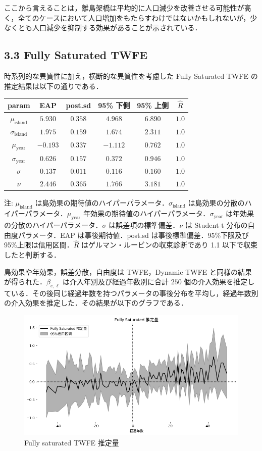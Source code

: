 ここから言えることは，離島架橋は平均的に人口減少を改善させる可能性が高く，全てのケースにおいて人口増加をもたらすわけではないかもしれないが，少なくとも人口減少を抑制する効果があることが示されている．

\hypertarget{fully-saturated-twfe-1}{%
\subsection{3.3 Fully Saturated TWFE}\label{fully-saturated-twfe-1}}

時系列的な異質性に加え，横断的な異質性を考慮した Fully Saturated TWFE
の推定結果は以下の通りである．

\begin{longtable}[]{@{}cccccc@{}}
\toprule
param & EAP & post.sd & 95\% 下側 & 95\% 上側 &
\(\hat{R}\)\tabularnewline
\midrule
\endhead
\(\mu_{\text{island}}\) & \(5.930\) & \(0.358\) & \(4.968\) & \(6.890\)
& \(1.0\)\tabularnewline
\(\sigma_{\text{island}}\) & \(1.975\) & \(0.159\) & \(1.674\) &
\(2.311\) & \(1.0\)\tabularnewline
\(\mu_{\text{year}}\) & \(-0.193\) & \(0.337\) & \(-1.112\) & \(0.762\)
& \(1.0\)\tabularnewline
\(\sigma_{\text{year}}\) & \(0.626\) & \(0.157\) & \(0.372\) & \(0.946\)
& \(1.0\)\tabularnewline
\(\sigma\) & \(0.137\) & \(0.011\) & \(0.116\) & \(0.160\) &
\(1.0\)\tabularnewline
\(\nu\) & \(2.446\) & \(0.365\) & \(1.766\) & \(3.181\) &
\(1.0\)\tabularnewline
\bottomrule
\end{longtable}

注: \(\mu_{\text{island}}\)
は島効果の期待値のハイパーパラメータ．\(\sigma_{\text{island}}\)
は島効果の分散のハイパーパラメータ．\(\mu_{\text{year}}\)
年効果の期待値のハイパーパラメータ．\(\sigma_{\text{year}}\)
は年効果の分散のハイパーパラメータ．\(\sigma\)
は誤差項の標準偏差．\(\nu\) は \(\text{Student-t}\)
分布の自由度パラメータ．EAP は事後期待値．post.sd
は事後標準偏差．95\%下限及び 95\%上限は信用区間．\(\hat{R}\)
はゲルマン・ルービンの収束診断であり 1.1 以下で収束したと判断する．

島効果や年効果，誤差分散，自由度は TWFE，Dynamic TWFE
と同様の結果が得られた．\(\beta_{e, \ell}\)
は介入年別及び経過年数別に合計 \(250\)
個の介入効果を推定している．その後同じ経過年数を持つパラメータの事後分布を平均し，経過年数別の介入効果を推定した．その結果が以下のグラフである．

\begin{figure}
\centering
\includegraphics{../figures/fully_saturated_twfe/ATT.png}
\caption{Fully saturated TWFE 推定量}
\end{figure}

